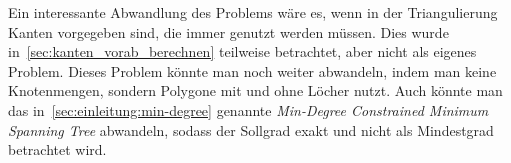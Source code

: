 Ein interessante Abwandlung des Problems wäre es, wenn in der Triangulierung Kanten vorgegeben sind, die immer genutzt werden müssen.
Dies wurde in~\cref{sec:kanten_vorab_berechnen} teilweise betrachtet, aber nicht als eigenes Problem.
Dieses Problem könnte man noch weiter abwandeln, indem man keine Knotenmengen, sondern Polygone mit und ohne Löcher nutzt.
Auch könnte man das in~\cref{sec:einleitung:min-degree} genannte \emph{Min-Degree Constrained Minimum Spanning Tree} abwandeln, sodass der Sollgrad exakt und nicht als Mindestgrad betrachtet wird.


